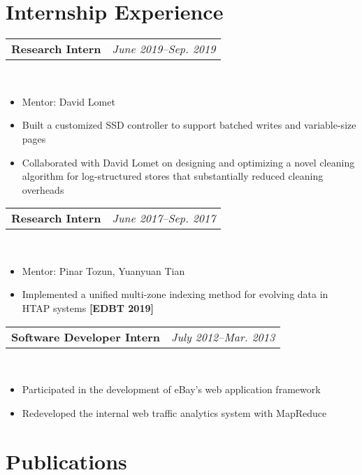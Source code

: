 \documentclass[11pt,a4paper,roman]{moderncv}        %
\makeatletter
\newcommand{\cvexpr}[5][1em]{
  \begin{tabular*}{\maincolumnwidth}{l@{\extracolsep{\fill}}r}%
    {\textbf{#3}\ifthenelse{\equal{#3}{}}{\textbf{#4}}{, #4}} & {\itshape#2}%
  \end{tabular*}%
  \\
  \begin{minipage}{\maincolumnwidth}%
        #5%
  \end{minipage}%
  \par\addvspace{#1}
}
\makeatother
\begin{document}
\section{Internship Experience}
\cvexpr{June 2019--Sep. 2019}{Research Intern}{Microsoft Research, Redmond}{
	\begin{itemize}
		\item Mentor: David Lomet
		\item Built a customized SSD controller to support batched writes and variable-size pages
		\item Collaborated with David Lomet on designing and optimizing a novel cleaning algorithm for log-structured stores that substantially
		reduced cleaning overheads
	\end{itemize}
}

\cvexpr{June 2017--Sep. 2017}{Research Intern}{IBM Almaden Research Center}{
	\begin{itemize}
		\item Mentor: Pinar Tozun, Yuanyuan Tian
		\item Implemented a unified multi-zone indexing method for evolving data in HTAP systems \textbf{[EDBT 2019]}
	\end{itemize}
}

\cvexpr{July 2012--Mar. 2013}{Software Developer Intern}{eBay China Development Center}{
\begin{itemize}
	\item Participated in the development of eBay's web application framework
	\item Redeveloped the internal web traffic analytics system with MapReduce
\end{itemize}
}
\section{Publications}
\end{document}

